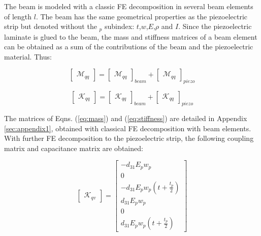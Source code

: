 \documentclass{ifacconf}
\begin{document}
The beam is modeled with a classic FE decomposition in several beam elements of length $l$. The beam has the same geometrical properties as the piezoelectric strip but denoted without the $_p$ subindex: $t$,$w$,$E$,$\rho$ and $I$. Since the piezoelectric laminate is glued to the beam, the mass and stiffness matrices of a beam element can be obtained as a sum of the contributions of the beam and the piezoelectric material. Thus:

\begin{equation}
\label{eq:mass}
\begin{bmatrix}
\mathcal{M}_{qq}
\end{bmatrix} = \begin{bmatrix}
\mathcal{M}_{qq}
\end{bmatrix}_{beam} +\begin{bmatrix}
\mathcal{M}_{qq}
\end{bmatrix}_{piezo} 
\end{equation}

\begin{equation}
\label{eq:stiffness}
\begin{bmatrix}
\mathcal{K}_{qq}
\end{bmatrix} = \begin{bmatrix}
\mathcal{K}_{qq}
\end{bmatrix}_{beam} +\begin{bmatrix}
\mathcal{K}_{qq}
\end{bmatrix}_{piezo}
\end{equation}

The matrices of Eqns. (\ref{eq:mass}) and (\ref{eq:stiffness}) are detailed in Appendix \ref{sec:appendix1}, obtained with classical FE decomposition with beam elements. With further FE decomposition to the piezoelectric strip, the following coupling matrix  and capacitance matrix are obtained:

\begin{equation}
\begin{bmatrix}
\mathcal{K}_{qv}
\end{bmatrix} = \begin{bmatrix}
-d_{31}E_pw_p \\ 0 \\ -d_{31}E_pw_p(t+\frac{t_p}{2} )\\ d_{31}E_pw_p \\ 0 \\ d_{31}E_pw_p(t+\frac{t_p}{2}) 
\end{bmatrix}
\end{equation}
\end{document}
